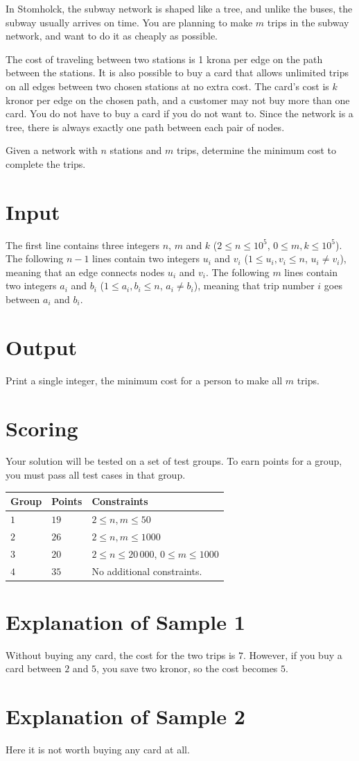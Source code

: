 In Stomholck, the subway network is shaped like a tree, and unlike the buses, the subway usually arrives on time.
You are planning to make $m$ trips in the subway network, and want to do it as cheaply as possible.

The cost of traveling between two stations is 1 krona per edge on the path between the stations.
It is also possible to buy a card that allows unlimited trips on all edges between two chosen stations at no extra cost.
The card's cost is $k$ kronor per edge on the chosen path, and a customer may not buy more than one card.
You do not have to buy a card if you do not want to. Since the network is a tree, there is always exactly one path between each pair of nodes.

Given a network with $n$ stations and $m$ trips, determine the minimum cost to complete the trips.

\section*{Input}
The first line contains three integers $n$, $m$ and $k$ ($2 \leq n \leq 10^5$, $0 \leq m, k \leq 10^5$).
The following $n-1$ lines contain two integers $u_i$ and $v_i$ ($1 \leq u_i, v_i \leq n$, $u_i \neq v_i$), meaning
that an edge connects nodes $u_i$ and $v_i$.
The following $m$ lines contain two integers $a_i$ and $b_i$ ($1 \leq a_i, b_i \leq n$, $a_i \neq b_i$), meaning
that trip number $i$ goes between $a_i$ and $b_i$.

\section*{Output}
Print a single integer, the minimum cost for a person to make all $m$ trips.

\section*{Scoring}
Your solution will be tested on a set of test groups. To earn points for a group, you must pass all test cases in that group.

\noindent
\begin{tabular}{| l | l | p{12cm} |}
  \hline
  \textbf{Group} & \textbf{Points} & \textbf{Constraints} \\ \hline
  $1$    & $19$      & $2 \le n, m \le 50$ \\ \hline
  $2$    & $26$      & $2 \le n, m \le 1000$ \\ \hline
  $3$    & $20$      & $2 \le n \le 20\,000$, $0 \le m \le 1000$ \\ \hline
  $4$    & $35$      & No additional constraints. \\ \hline
\end{tabular}

\section*{Explanation of Sample 1}
Without buying any card, the cost for the two trips is $7$. However, if you buy
a card between $2$ and $5$, you save two kronor, so the cost becomes $5$.

\section*{Explanation of Sample 2}
Here it is not worth buying any card at all.
